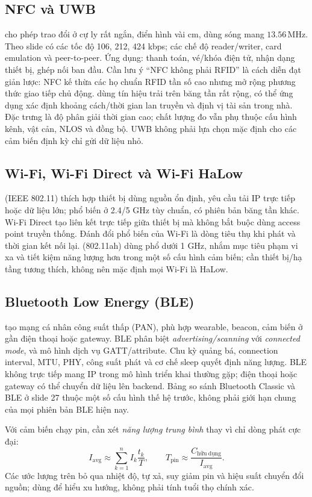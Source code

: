 \subsection{NFC và UWB}
 cho phép trao đổi ở cự ly rất ngắn, điển hình vài cm, dùng sóng mang \(13.56\,\mathrm{MHz}\). Theo slide có các tốc độ 106, 212, 424 kbps; các chế độ reader/writer, card emulation và peer-to-peer. Ứng dụng: thanh toán, vé/khóa điện tử, nhận dạng thiết bị, ghép nối ban đầu. Cần lưu ý ``NFC không phải RFID'' là cách diễn đạt giản lược: NFC kế thừa các họ chuẩn RFID tần số cao nhưng mở rộng phương thức giao tiếp chủ động.
 dùng tín hiệu trải trên băng tần rất rộng, có thể ứng dụng xác định khoảng cách/thời gian lan truyền và định vị tài sản trong nhà. Đặc trưng là độ phân giải thời gian cao; chất lượng đo vẫn phụ thuộc cấu hình kênh, vật cản, NLOS và đồng bộ. UWB không phải lựa chọn mặc định cho các cảm biến định kỳ chỉ gửi dữ liệu nhỏ.
\subsection{Wi-Fi, Wi-Fi Direct và Wi-Fi HaLow}
 (IEEE 802.11) thích hợp thiết bị dùng nguồn ổn định, yêu cầu tải IP trực tiếp hoặc dữ liệu lớn; phổ biến ở 2.4/5 GHz tùy chuẩn, có phiên bản băng tần khác. Wi-Fi Direct tạo liên kết trực tiếp giữa thiết bị mà không bắt buộc dùng access point truyền thống. Đánh đổi phổ biến của Wi-Fi là dòng tiêu thụ khi phát và thời gian kết nối lại.  (802.11ah) dùng phổ dưới 1 GHz, nhắm mục tiêu phạm vi xa và tiết kiệm năng lượng hơn trong một số cấu hình cảm biến; cần thiết bị/hạ tầng tương thích, không nên mặc định mọi Wi-Fi là HaLow.
\subsection{Bluetooth Low Energy (BLE)}
 tạo mạng cá nhân công suất thấp (PAN), phù hợp wearable, beacon, cảm biến ở gần điện thoại hoặc gateway. BLE phân biệt \emph{advertising/scanning} với \emph{connected mode}, và mô hình dịch vụ GATT/attribute. Chu kỳ quảng bá, connection interval, MTU, PHY, công suất phát và cơ chế sleep quyết định năng lượng. BLE không trực tiếp mang IP trong mô hình triển khai thường gặp; điện thoại hoặc gateway có thể chuyển dữ liệu lên backend. Bảng so sánh Bluetooth Classic và BLE ở slide 27 thuộc một số cấu hình thế hệ trước, không phải giới hạn chung của mọi phiên bản BLE hiện nay.
\begin{keybox}
Với cảm biến chạy pin, cần xét \emph{năng lượng trung bình} thay vì chỉ dòng phát cực đại: \[I_{\mathrm{avg}}\approx\sum_{k=1}^{n}I_k\frac{t_k}{T},\qquad T_{\mathrm{pin}}\approx\frac{C_{\mathrm{hữu\ dụng}}}{I_{\mathrm{avg}}}.\]
Các ước lượng trên bỏ qua nhiệt độ, tự xả, suy giảm pin và hiệu suất chuyển đổi nguồn; dùng để hiểu xu hướng, không phải tính tuổi thọ chính xác.
\end{keybox}

